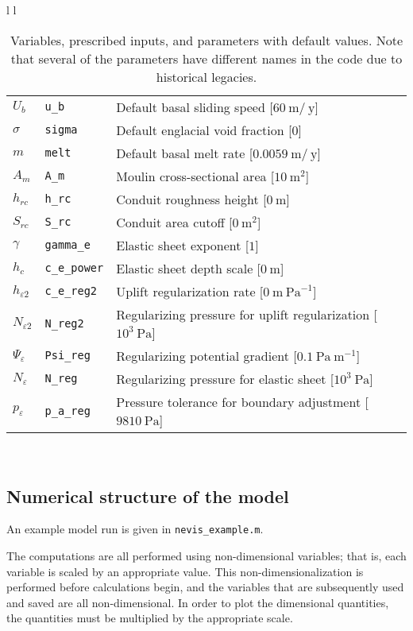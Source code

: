 \documentclass[a4paper,11pt,fleqn]{article}
\newcommand{\un}[1]{\ \textrm{#1}}
\newcommand{\eps}{\varepsilon}
\begin{document}
{{\begin{table}[!h]
{\begin{tabular}{l l}
\begin{tabular}[t]{l l l}
$U_b$		&\verb|u_b| &  Default basal sliding speed [$60\un{m}/\un{y}$] \\
$\sigma$		&\verb|sigma| &  Default englacial void fraction [$0$] \\
$m$			&\verb|melt| &  Default basal melt rate [$0.0059\un{m}/\un{y}$] \\
$A_m$		&\verb|A_m| &  Moulin cross-sectional area [$10\un{m}^2$] \\
$h_{rc}$		&\verb|h_rc| &  Conduit roughness height [$0\un{m}$] \\
$S_{rc}$		&\verb|S_rc| &  Conduit area cutoff [$0\un{m}^2$] \\
$\gamma$ 	&\verb|gamma_e| &  Elastic sheet exponent [$1$]\\
$h_c$		&\verb|c_e_power| &  Elastic sheet depth scale [$0\un{m}$] \\
$h_{\eps 2}$	&\verb|c_e_reg2| & Uplift regularization rate [$0\un{m}\un{Pa}^{-1}$] \\
$N_{\eps 2}$	&\verb|N_reg2| & Regularizing pressure for uplift regularization [$10^3\un{Pa}$] \\
$\Psi_{\eps}$   &\verb|Psi_reg| &  Regularizing potential gradient [$0.1\un{Pa}\un{m}^{-1}$] \\
$N_{\eps}$	&\verb|N_reg| & Regularizing pressure for elastic sheet [$10^3\un{Pa}$] \\
$p_{\eps}$	&\verb|p_a_reg| & Pressure tolerance for boundary adjustment [$9810\un{Pa}$] \\

\end{tabular}  \\
\hline
\end{tabular}
}
\caption{\label{tab1}{\small Variables, prescribed inputs, and parameters with default values. Note that several of the parameters have different names in the code due to historical legacies.}}
\end{table}


\subsection*{Numerical structure of the model}

An example model run is given in {\verb|nevis_example.m|}.

The computations are all performed using non-dimensional variables; that is, each variable is scaled by an appropriate value.  This non-dimensionalization is performed before calculations begin, and the variables that are subsequently used and saved are all non-dimensional.  In order to plot the dimensional quantities, the quantities must be multiplied by the appropriate scale. 

}}
\end{document}
